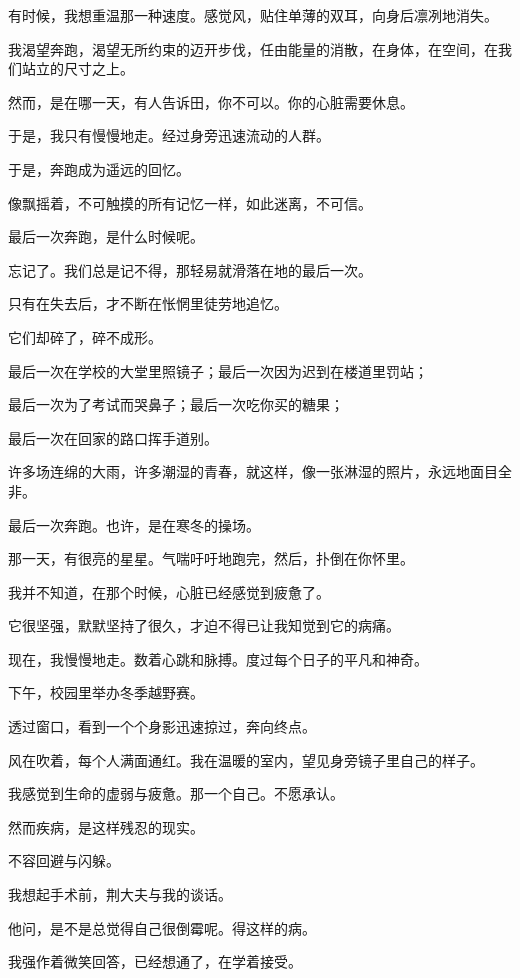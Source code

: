 \documentclass[12pt,a4paper]{article}
\begin{document}
		有时候，我想重温那一种速度。感觉风，贴住单薄的双耳，向身后凛冽地消失。\par
		我渴望奔跑，渴望无所约束的迈开步伐，任由能量的消散，在身体，在空间，在我们站立的尺寸之上。\par
		然而，是在哪一天，有人告诉田，你不可以。你的心脏需要休息。\par
		于是，我只有慢慢地走。经过身旁迅速流动的人群。\par
		于是，奔跑成为遥远的回忆。\par
		像飘摇着，不可触摸的所有记忆一样，如此迷离，不可信。\par
		最后一次奔跑，是什么时候呢。\par
		忘记了。我们总是记不得，那轻易就滑落在地的最后一次。\par
		只有在失去后，才不断在怅惘里徒劳地追忆。\par
		它们却碎了，碎不成形。\par
		最后一次在学校的大堂里照镜子；最后一次因为迟到在楼道里罚站；\par
		最后一次为了考试而哭鼻子；最后一次吃你买的糖果；\par
		最后一次在回家的路口挥手道别。\par
		许多场连绵的大雨，许多潮湿的青春，就这样，像一张淋湿的照片，永远地面目全非。\par
		最后一次奔跑。也许，是在寒冬的操场。\par
		那一天，有很亮的星星。气喘吁吁地跑完，然后，扑倒在你怀里。\par
		我并不知道，在那个时候，心脏已经感觉到疲惫了。\par
		它很坚强，默默坚持了很久，才迫不得已让我知觉到它的病痛。\par
		现在，我慢慢地走。数着心跳和脉搏。度过每个日子的平凡和神奇。\par
		下午，校园里举办冬季越野赛。\par
		透过窗口，看到一个个身影迅速掠过，奔向终点。\par
		风在吹着，每个人满面通红。我在温暖的室内，望见身旁镜子里自己的样子。\par
		我感觉到生命的虚弱与疲惫。那一个自己。不愿承认。\par
		然而疾病，是这样残忍的现实。\par
		不容回避与闪躲。\par
		我想起手术前，荆大夫与我的谈话。\par
		他问，是不是总觉得自己很倒霉呢。得这样的病。\par
		我强作着微笑回答，已经想通了，在学着接受。\par
\end{document}
